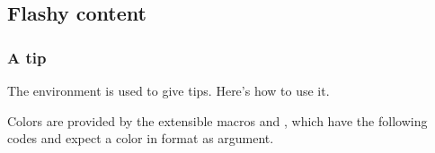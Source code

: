 \documentclass[10pt, a4paper]{article}
\begin{document}
\subsection{Flashy content}

\subsubsection{A tip}

The  environment is used to give tips. Here's how to use it.



\smallskip

\begin{tdocnote}
    Colors are provided by the extensible macros  and , which have the following codes and expect a color in  format as argument.

    \begin{tdoclatex}[code]
    \end{tdoclatex}
\end{tdocnote}
\end{document}
